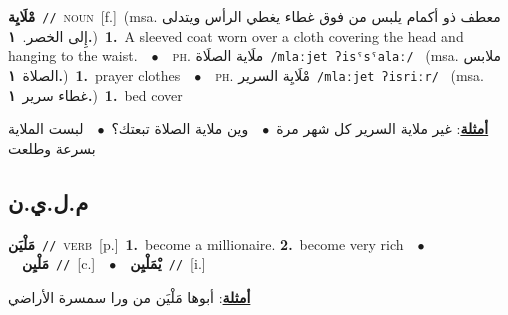 \documentclass[10pt,a4paper,twoside]{article} %
\begin{document}
\begin{multicols}{2}
{\setlength\topsep{0pt}\textbf{\foreignlanguage{arabic}{مْلَايِة}}\ {\color{gray}\texttt{//}\color{black}}\ \textsc{noun}\ [f.]\ \color{gray}(msa. \foreignlanguage{arabic}{معطف ذو أكمام يلبس من فوق غطاء يغطي الرأس ويتدلى إِلى الخصر.}~\foreignlanguage{arabic}{\textbf{١.}})\color{black}\ \textbf{1.}~A sleeved coat worn over a cloth covering the head and hanging to the waist.\ \ $\bullet$\ \ \textsc{ph.} \color{gray} \foreignlanguage{arabic}{ملَاية الصلَاة}\color{black}\ {\color{gray}\texttt{/{\sffamily mlaːjet ʔisˤsˤalaː}/}\color{black}}\ \color{gray} (msa. \foreignlanguage{arabic}{ملابس الصلاة}~\foreignlanguage{arabic}{\textbf{١.}})\color{black}\ \textbf{1.}~prayer clothes\ \ $\bullet$\ \ \textsc{ph.} \color{gray} \foreignlanguage{arabic}{مْلَايِة السرير}\color{black}\ {\color{gray}\texttt{/{\sffamily mlaːjet ʔisriːr}/}\color{black}}\ \color{gray} (msa. \foreignlanguage{arabic}{غطاء سرير}~\foreignlanguage{arabic}{\textbf{١.}})\color{black}\ \textbf{1.}~bed cover\  \begin{flushright}\color{gray}\foreignlanguage{arabic}{\textbf{\underline{\foreignlanguage{arabic}{أمثلة}}}: غير ملاية السرير كل شهر مرة\ $\bullet$\ \  وين ملاية الصلاة تبعتك؟\ $\bullet$\ \  لبست الملاية بسرعة وطلعت}\end{flushright}\color{black}} \vspace{2mm}

\vspace{-3mm}
\subsection*{\color{blue}\foreignlanguage{arabic}{م.ل.ي.ن}\color{blue}{}} 

{\setlength\topsep{0pt}\textbf{\foreignlanguage{arabic}{مَلْيَن}}\ {\color{gray}\texttt{//}\color{black}}\ \textsc{verb}\ [p.]\ \textbf{1.}~become a millionaire.  \textbf{2.}~become very rich\ \ $\bullet$\ \ \setlength\topsep{0pt}\textbf{\foreignlanguage{arabic}{مَلْيِن}}\ {\color{gray}\texttt{//}\color{black}}\ [c.]\ \ $\bullet$\ \ \setlength\topsep{0pt}\textbf{\foreignlanguage{arabic}{يْمَلْيِن}}\ {\color{gray}\texttt{//}\color{black}}\ [i.]\  \begin{flushright}\color{gray}\foreignlanguage{arabic}{\textbf{\underline{\foreignlanguage{arabic}{أمثلة}}}: أبوها مَلْيَن من ورا سمسرة الأراضي}\end{flushright}\color{black}} \vspace{2mm}


\end{multicols}
\end{document}
